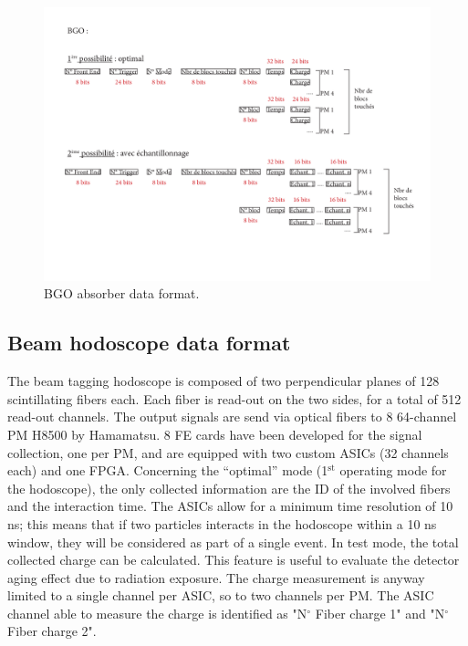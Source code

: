   	\begin{figure} [hbtp]
	\centering
	\caption{BGO absorber data format.}
	\includegraphics[width=1.2\textwidth]{03_GraphicFiles/appendixA_dataFormat/2015_05_14_Format_datas_acquisition_BGO.pdf}
	\end{figure}



\clearpage
\subsection{Beam hodoscope data format}
The beam tagging hodoscope is composed of two perpendicular planes of 128 scintillating fibers each. Each fiber is read-out on the two sides, for a total of  512 read-out channels. The output signals are send via optical fibers to 8 64-channel PM H8500 by Hamamatsu. 8 FE cards have been developed for the signal collection, one per PM, and are equipped with two custom ASICs (32 channels each) and one FPGA.\newline
Concerning the \enquote{optimal} mode (1$^{\mathrm{st}}$ operating mode for the hodoscope), the only collected information are the ID of the involved fibers and the interaction time. The ASICs allow for a minimum time resolution of 10 ns; this means that if two particles interacts in the hodoscope within a 10 ns window, they will be considered as part of a single event.\newline
In test mode, the total collected charge can be calculated. This feature is useful to evaluate the detector aging effect due to radiation exposure. The charge measurement is anyway limited to a single channel per ASIC, so to two channels per PM. The ASIC channel able to measure the charge is identified as "N$^{\circ}$ Fiber charge 1" and "N$^{\circ}$ Fiber charge 2".


